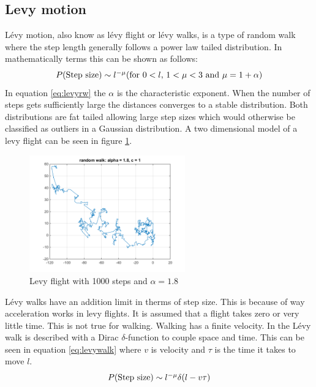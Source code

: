 \subsection{Levy motion}
Lévy motion, also know as lévy flight or lévy walks, is a type of random walk where the step length generally follows a power law tailed distribution. In mathematically terms this can be shown as follows:
\begin{equation}
P($Step size$) \sim l ^{-\mu} ($for $ 0 < l $, $1 < \mu < 3$ and $ \mu = 1 + \alpha)
\label{eq:levyrw}
\end{equation}
In equation \ref{eq:levyrw} the $\alpha$ is the characteristic exponent. When the number of steps gets sufficiently large the distances converges to a stable distribution. Both distributions are fat tailed allowing large step sizes which would otherwise be classified as outliers in a Gaussian distribution. A two dimensional model of a levy flight can be seen in figure \ref{fig:levywalk1}.
\begin{figure}[H]
\centering
\includegraphics[width = 0.6\textwidth]{billeder/levywalk1}
\caption{Levy flight with 1000 steps and $\alpha = 1.8$}
\label{fig:levywalk1}
\end{figure}
Lévy walks have an addition limit in therms of step size. This is because of way acceleration works in levy flights. It is assumed that a flight takes zero or very little time. This is not true for walking. Walking has a finite velocity. In \cite{viswanathan2011the} the Lévy walk is described with a Dirac $\delta$-function to couple space and time. This can be seen in equation \ref{eq:levywalk} where $v$ is velocity and $\tau$ is the time it takes to move $l$.
\begin{equation}
P($Step size$) \sim l ^{-\mu}\delta (l - v\tau)
\label{eq:levywalk}
\end{equation}

